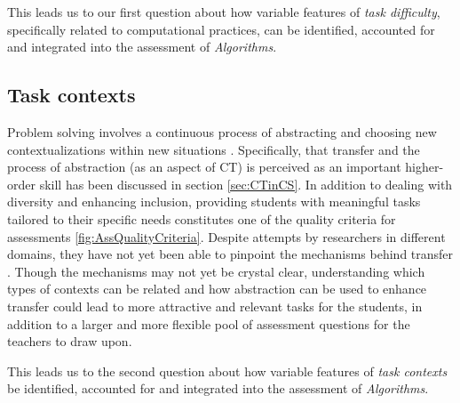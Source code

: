 This leads us to our first question about how variable features of \emph{task difficulty}, specifically related to computational practices, can be identified, accounted for and integrated into the assessment of \emph{Algorithms}.



\subsection*{Task contexts}
Problem solving involves a continuous process of abstracting and choosing new contextualizations within new situations \cite{oers2004recontextualization}. Specifically, that transfer and the process of abstraction (as an aspect of CT) is perceived as an important higher-order skill has been discussed in section \ref{sec:CTinCS}. In addition to dealing with diversity and enhancing inclusion, providing students with meaningful tasks tailored to their specific needs constitutes one of the quality criteria for assessments \ref{fig:AssQualityCriteria}. Despite attempts by researchers in different domains, they have not yet been able to pinpoint the mechanisms behind transfer \cite{oers2004recontextualization}. Though the mechanisms may not yet be crystal clear, understanding which types of contexts can be related and how abstraction can be used to enhance transfer could lead to more attractive and relevant tasks for the students, in addition to a larger and more flexible pool of assessment questions for the teachers to draw upon.

This leads us to the second question about how variable features of \emph{task contexts} be identified, accounted for and integrated into the assessment of \emph{Algorithms}.



